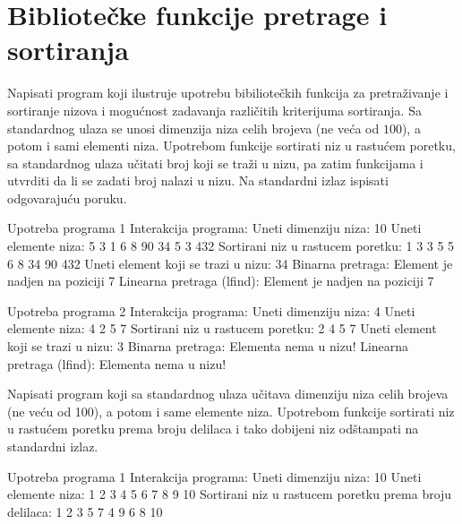 \section{Bibliotečke funkcije pretrage i sortiranja}
\begin{Exercise}[label=517]
  Napisati program koji ilustruje upotrebu bibiliotečkih funkcija za
  pretraživanje i sortiranje nizova i mogućnost zadavanja različitih
  kriterijuma sortiranja. Sa standardnog ulaza se unosi dimenzija niza
  celih brojeva (ne veća od $100$), a potom i sami elementi
  niza. Upotrebom funkcije  sortirati niz u rastućem
  poretku, sa standardnog ulaza učitati broj koji se traži u nizu, pa
  zatim funkcijama  i  utvrditi da li se
  zadati broj nalazi u nizu. Na standardni izlaz ispisati
  odgovarajuću poruku.
  
\begin{miditest}
\begin{test}{Upotreba programa 1}
Interakcija programa:    
  Uneti dimenziju niza: 10
  Uneti elemente niza:
  5 3 1 6 8 90 34 5 3 432
  Sortirani niz u rastucem poretku:
  1 3 3 5 5 6 8 34 90 432 
  Uneti element koji se trazi u nizu: 34
  Binarna pretraga: 
  Element je nadjen na poziciji 7
  Linearna pretraga (lfind): 
  Element je nadjen na poziciji 7
\end{test}
\end{miditest}
\begin{miditest}
\begin{test}{Upotreba programa 2}
Interakcija programa:
  Uneti dimenziju niza: 4
  Uneti elemente niza:
  4 2 5 7
  Sortirani niz u rastucem poretku:
  2 4 5 7 
  Uneti element koji se trazi u nizu: 3
  Binarna pretraga: 
  Elementa nema u nizu!
  Linearna pretraga (lfind): 
  Elementa nema u nizu!
\end{test}
\end{miditest}
  
\end{Exercise}

\begin{Answer}[ref=517]
\end{Answer}
\begin{Exercise}[label=518]
  Napisati program koji sa standardnog ulaza učitava dimenziju niza
  celih brojeva (ne veću od 100), a potom i same elemente
  niza. Upotrebom funkcije  sortirati niz u rastućem
  poretku prema broju delilaca i tako dobijeni niz odštampati na
  standardni izlaz.
  
\begin{maxitest}
\begin{test}{Upotreba programa 1}
Interakcija programa:
  Uneti dimenziju niza: 10
  Uneti elemente niza:
  1 2 3 4 5 6 7 8 9 10
  Sortirani niz u rastucem poretku prema broju delilaca:
  1 2 3 5 7 4 9 6 8 10  
\end{test}
\end{maxitest}
  
\end{Exercise}

